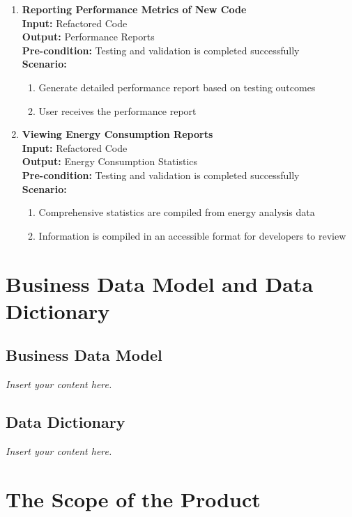 \documentclass[12pt]{article}
\newcommand{\lips}{\textit{Insert your content here.}}
\begin{document}
\begin{enumerate}[label={\bf BUC \arabic*:}, wide=0pt, font=\itshape]
  \item {\bf Reporting Performance Metrics of New Code} \\[2mm]
    \textbf{Input:} Refactored Code \\
    \textbf{Output:} Performance Reports\\
    \textbf{Pre-condition:} Testing and validation is completed successfully \\[2mm]
    \textbf{Scenario: }
    \begin{enumerate}[label=\arabic*.]
        \item Generate detailed performance report based on testing outcomes
        \item User receives the performance report
    \end{enumerate}

  \item {\bf Viewing Energy Consumption Reports} \\[2mm]
    \textbf{Input:} Refactored Code \\
    \textbf{Output:} Energy Consumption Statistics \\
    \textbf{Pre-condition:} Testing and validation is completed successfully \\[2mm]
    \textbf{Scenario: }
    \begin{enumerate}[label=\arabic*.]
        \item Comprehensive statistics are compiled from energy analysis data
        \item Information is compiled in an accessible format for developers to review
    \end{enumerate}
\end{enumerate}

\section{Business Data Model and Data Dictionary}
\subsection{Business Data Model}
\lips
\subsection{Data Dictionary}
\lips

\section{The Scope of the Product}
\end{document}
